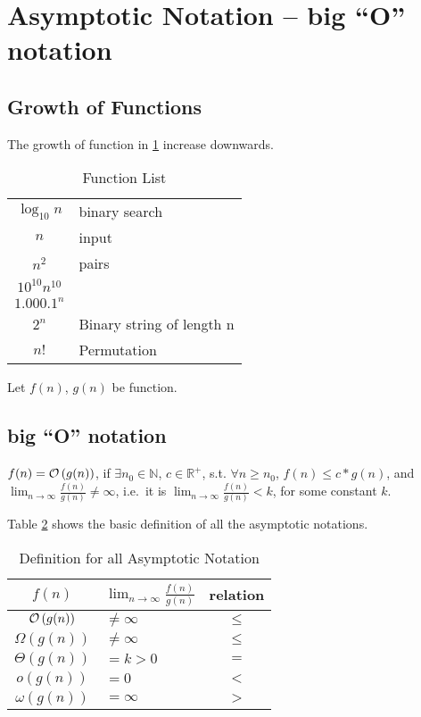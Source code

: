 
\section{Asymptotic Notation -- big ``O'' notation}

\subsection{Growth of Functions}

The growth of function in \cref{function_list} increase downwards.
\begin{table}[H]
\centering
\caption{Function List}\label{function_list}
\begin{tabular}{c|l}
$\log_{10} n$ & binary search \\
$n$ & input \\
$n^2$ & pairs \\
$10^{10}n^{10}$ & \\
$1.000.1^n$ & \\
$2^n$ & Binary string of length n \\
$n!$ & Permutation \\
\end{tabular}
\end{table}
Let $f(n)$, $g(n)$ be function.

\subsection{big ``O'' notation}
\begin{definition}

$f(n) = \mathcal{O}\left(g(n)\right)$, if $\exists n_0 \in \mathbb{N}$,
$c \in \mathbb{R}^+$, s.t. $\forall n \geq n_0$, $f(n) \leq c * g(n)$,
and $\displaystyle\lim_{n \rightarrow \infty} \frac{f(n)}{g(n)} \ne \infty$,
i.e.\ it is $\displaystyle\lim_{n \rightarrow \infty} \frac{f(n)}{g(n)} < k$, for some constant $k$.
\end{definition}

Table \ref{def_asymptotic_notation} shows the basic definition of all the asymptotic notations.
\begin{table}[H]
\centering
\caption{Definition for all Asymptotic Notation}\label{def_asymptotic_notation}
\begin{tabular}{c|l|c}
\hline
$f(n)$ & $\displaystyle\lim_{n \rightarrow \infty} \frac{f(n)}{g(n)}$ & relation \\
\hline
\hline
$\mathcal{O}\left(g(n)\right)$ & $\neq \infty$ & $\leq$ \\
$\Omega(g(n))$  & $\neq \infty$ & $\leq$  \\
$\Theta(g(n))$  & $= k > 0$ & $=$  \\
$o(g(n))$  & $= 0$ & $<$  \\
$\omega(g(n))$  & $= \infty$ & $>$  \\
\end{tabular}
\end{table}

